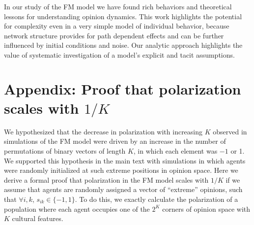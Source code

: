 In our study of the FM model we have found rich behaviors and theoretical lessons for understanding opinion dynamics. This work highlights the potential for complexity even in a very simple model of individual behavior, because network structure provides for path dependent effects and can be further influenced by initial conditions and noise. Our analytic approach highlights the value of systematic investigation of a model's explicit and tacit assumptions. 

\section*{Appendix: Proof that polarization scales with $1/K$}

We hypothesized that the decrease in polarization with increasing $K$ observed in simulations of the FM model were driven by an increase in the number of permutations of binary vectors of length $K$, in which each element was $-1$ or 1. We supported this hypothesis in the main text with simulations in which agents were randomly initialized at such extreme positions in opinion space. Here we derive a formal proof that polarization in the FM model scales with $1/K$ if we assume that agents are randomly assigned a vector of ``extreme'' opinions, such that $\forall {i,k}$, $s_{ik} \in \{-1, 1\}$. 
To do this, we exactly calculate the polarization of a population 
where each agent occupies one of the $2^K$ corners of opinion space with $K$
cultural features. 

